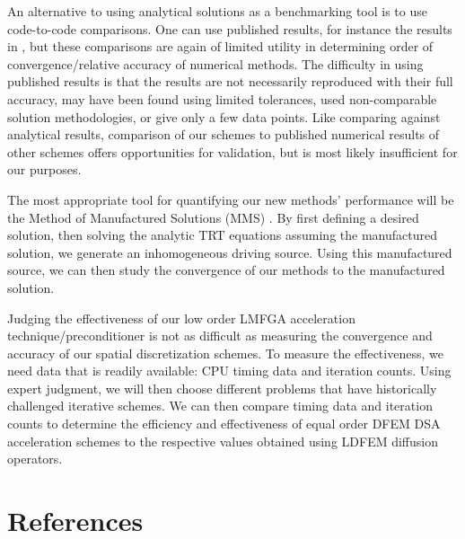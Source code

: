 \documentclass[final,3p,times]{elsarticle}
\begin{document}
An alternative to using analytical solutions as a benchmarking tool is to use code-to-code comparisons.
One can use published results, for instance the results in \cite{morel_radtran}, but these comparisons are again of limited utility in determining order of convergence/relative accuracy of numerical methods.
The difficulty in using published results is that the results are not necessarily reproduced with their full accuracy, may have been found using limited tolerances, used non-comparable solution methodologies, or give only a few data points.
Like comparing against analytical results, comparison of our schemes to published numerical results of other schemes offers opportunities for validation, but is most likely insufficient for our purposes.

The most appropriate tool for quantifying our new methods' performance will be the Method of Manufactured Solutions (MMS) \cite{mms}.
By first defining a desired solution, then solving the analytic TRT equations assuming the manufactured solution, we generate an inhomogeneous driving source.
Using this manufactured source, we can then study the convergence of our methods to the manufactured solution.

Judging the effectiveness of our low order LMFGA acceleration technique/preconditioner is not as difficult as measuring the convergence and accuracy of our spatial discretization schemes.
To measure the effectiveness, we need data that is readily available: CPU timing data and iteration counts.
Using expert judgment, we will then choose different problems that have historically challenged iterative schemes.
We can then compare timing data and iteration counts to determine the efficiency and effectiveness of equal order DFEM DSA acceleration schemes to the respective values obtained using LDFEM diffusion operators.  


\section*{References}
\end{document}
